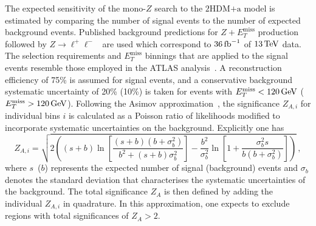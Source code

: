 \documentclass[a4paper, 11pt,notoc]{article}
\newcommand{\MET}{\ensuremath{E_T^\mathrm{miss}}\xspace}
\newcommand{\hdma}{\ensuremath{\textrm{2HDM+a}}\xspace}
\begin{document}
 The expected sensitivity of the mono-$Z$ search to the \hdma model is estimated by comparing the number of  signal events to the number of expected background events. Published background predictions for $Z+\MET$ production followed by $Z \to \ell^+ \ell^-$~\cite{Aaboud:2017bja} are used which correspond to $36 \, {\rm fb}^{-1}$ of $13 \, {\rm TeV}$ data. The selection requirements and \MET binnings that are applied to the signal events resemble those employed in the ATLAS analysis~\cite{Aaboud:2017bja}. A reconstruction efficiency of 75\% is assumed for signal events,  and a conservative background systematic uncertainty of 20\% (10\%) is taken for events with $\MET < 120  \, {\rm GeV}$ ($\MET > 120  \, {\rm GeV}$). Following the Asimov approximation~\cite{Cowan:2010js}, the significance $Z_{A,i}$ for individual bins $i$ is calculated as a Poisson ratio of likelihoods modified to incorporate systematic uncertainties on the background. Explicitly one has \cite{Cowan:2012}
\begin{equation}
\label{eq:significance_wsyst}
Z_{A, i} = \sqrt{ 2 \left ( \left ( s + b \right ) \ln \left [ \frac{\left (s+b \right ) \left (b + \sigma_b^2 \right )}{b^2 + \left ( s +b \right ) \sigma_b^2 } \right ]  - \frac{b^2}{\sigma_b^2} \ln \left [ 1 + \frac{\sigma_b^2 s}{b \left ( b + \sigma_b^2 \right )} \right ] \right ) } \,, 
\end{equation}
where $s$~($b$) represents the expected number of signal (background) events and $\sigma_b$ denotes the standard deviation that characterises the systematic uncertainties of the background. The total significance $Z_A$ is then defined by adding the individual $Z_{A, i}$ in quadrature.   In this approximation, one expects to exclude regions with total significances of $Z_A > 2$. %
\end{document}
